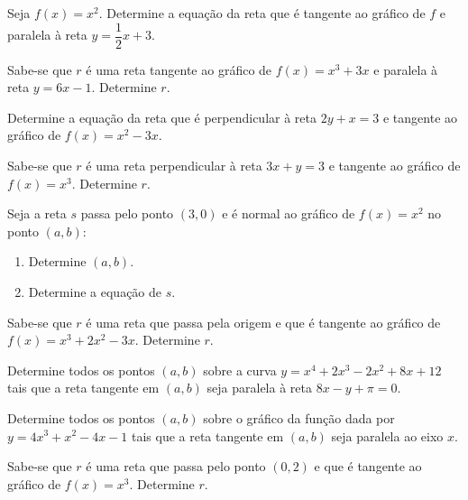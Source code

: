 \begin{exercicio}[2]
Seja $f(x) = x^2$. Determine a equação da reta que é tangente ao gráfico de $f$ e paralela à reta $y = \dfrac{1}{2}x + 3$.
\end{exercicio}

\begin{exercicio}[3]
Sabe-se que $r$ é uma reta tangente ao gráfico de $f(x) = x^3 + 3x$ e paralela à reta $y = 6x - 1$. Determine $r$.
\end{exercicio}

\begin{exercicio}[4]
Determine a equação da reta que é perpendicular à reta $2y + x = 3$ e tangente ao gráfico de $f(x) = x^2 - 3x$.
\end{exercicio}

\begin{exercicio}[5]
Sabe-se que $r$ é uma reta perpendicular à reta $3x + y = 3$ e tangente ao gráfico de $f(x) = x^3$. Determine $r$.
\end{exercicio}

\begin{exercicio}[6]
Seja a reta $s$ passa pelo ponto $(3, 0)$ e é normal ao gráfico de $f(x) = x^2$ no ponto $(a, b)$:
\begin{enumerate}[label=\alph*)]
    \item Determine $(a, b)$.
    \item Determine a equação de $s$.
\end{enumerate}
\end{exercicio}

\begin{exercicio}[7]
Sabe-se que $r$ é uma reta que passa pela origem e que é tangente ao gráfico de $f(x) = x^3 + 2x^2 - 3x$. Determine $r$.
\end{exercicio}

\begin{exercicio}[8]
Determine todos os pontos $(a, b)$ sobre a curva $y = x^4 + 2x^3 - 2x^2 + 8x + 12$ tais que a reta tangente em $(a, b)$ seja paralela à reta $8x - y + \pi = 0$.
\end{exercicio}

\begin{exercicio}[9]
Determine todos os pontos $(a, b)$ sobre o gráfico da função dada por $y = 4x^3 + x^2 - 4x - 1$ tais que a reta tangente em $(a, b)$ seja paralela ao eixo $x$.
\end{exercicio}

\begin{exercicio}[10]
Sabe-se que $r$ é uma reta que passa pelo ponto $(0, 2)$ e que é tangente ao gráfico de $f(x) = x^3$. Determine $r$.
\end{exercicio}

